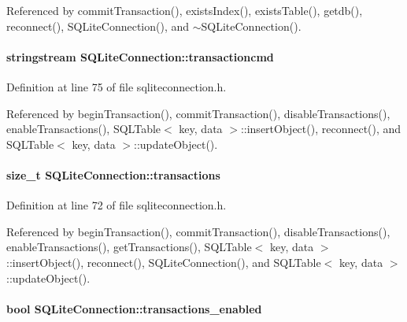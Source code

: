 Referenced by commit\-Transaction(), exists\-Index(), exists\-Table(), getdb(), reconnect(), SQLite\-Connection(), and $\sim$SQLite\-Connection().\hypertarget{classSQLiteConnection_SQLiteConnectiono7}{
\paragraph[transactioncmd]{\setlength{\rightskip}{0pt plus 5cm}stringstream SQLite\-Connection::transactioncmd}\hfill}
\label{classSQLiteConnection_SQLiteConnectiono7}




Definition at line 75 of file sqliteconnection.h.

Referenced by begin\-Transaction(), commit\-Transaction(), disable\-Transactions(), enable\-Transactions(), SQLTable$<$ key, data $>$::insert\-Object(), reconnect(), and SQLTable$<$ key, data $>$::update\-Object().\hypertarget{classSQLiteConnection_SQLiteConnectiono5}{
\paragraph[transactions]{\setlength{\rightskip}{0pt plus 5cm}size\_\-t SQLite\-Connection::transactions}\hfill}
\label{classSQLiteConnection_SQLiteConnectiono5}




Definition at line 72 of file sqliteconnection.h.

Referenced by begin\-Transaction(), commit\-Transaction(), disable\-Transactions(), enable\-Transactions(), get\-Transactions(), SQLTable$<$ key, data $>$::insert\-Object(), reconnect(), SQLite\-Connection(), and SQLTable$<$ key, data $>$::update\-Object().\hypertarget{classSQLiteConnection_SQLiteConnectiono8}{
\paragraph[transactions\_\-enabled]{\setlength{\rightskip}{0pt plus 5cm}bool SQLite\-Connection::transactions\_\-enabled}\hfill}
\label{classSQLiteConnection_SQLiteConnectiono8}





